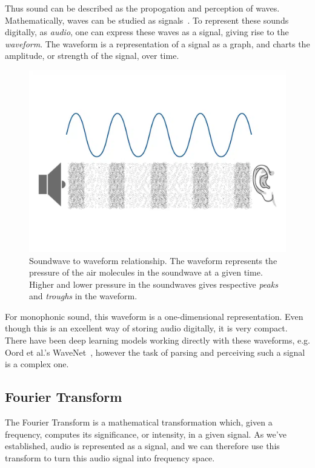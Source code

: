 Thus sound can be described as the propogation and perception of waves. Mathematically, waves can be studied as signals~\cite{8454362}. To represent these sounds digitally, as \textit{audio}, one can express these waves as a signal, giving rise to the \textit{waveform}. The waveform is a representation of a signal as a graph, and charts the amplitude, or strength of the signal, over time.

\begin{figure}[H]
    \centering
    \includegraphics[scale=0.35]{figures/waveform}
    \caption{Soundwave to waveform relationship. The waveform represents the pressure of the air molecules in the soundwave at a given time. Higher and lower pressure in the soundwaves gives respective \textit{peaks} and \textit{troughs} in the waveform.}
    \label{WaveformFigure}
\end{figure}

For monophonic sound, this waveform is a one-dimensional representation. Even though this is an excellent way of storing audio digitally, it is very compact. There have been deep learning models working directly with these waveforms, e.g. Oord et al.'s WaveNet~\cite{oord2016wavenetgenerativemodelraw}, however the task of parsing and perceiving such a signal is a complex one.

\subsection{Fourier Transform}

The Fourier Transform is a mathematical transformation which, given a frequency, computes its significance, or intensity, in a given signal. As we've established, audio is represented as a signal, and we can therefore use this transform to turn this audio signal into frequency space. 


